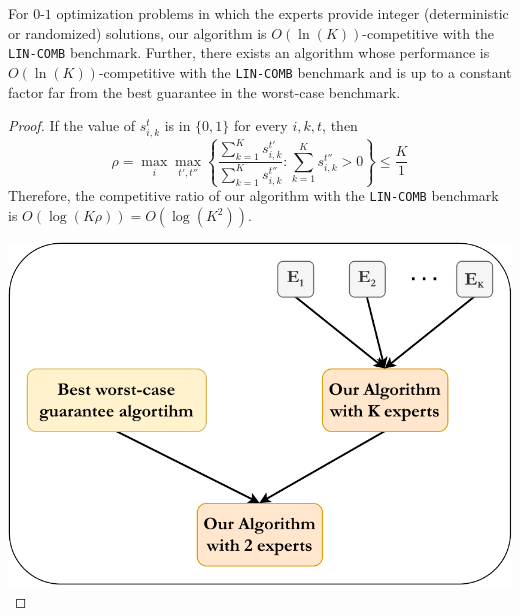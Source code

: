 \begin{corollary} \label{corollary}
	For $0$-$1$ optimization problems in which the experts provide integer (deterministic or randomized) solutions,
	our algorithm is $O(\ln (K))$-competitive with the \texttt{LIN-COMB} benchmark.
	Further, there exists an algorithm whose performance is $O(\ln (K))$-competitive with the \texttt{LIN-COMB}
	benchmark and is up to a constant factor far from the best guarantee in the worst-case benchmark.
\end{corollary}
%
\begin{proof}

	\begin{minipage}[t]{8cm}
		If the value of $s_{i,k}^{t}$ is in $\{0,1\}$ for every $i,k,t$, then
		\[
			\rho = \max_{i} \max_{t',t''} \left\{\frac{\sum_{k=1}^{K} s_{i,k}^{t'}}{\sum_{k=1}^{K} s_{i,k}^{t''}} : \sum_{k=1}^{K} s_{i,k}^{t''} > 0 \right\}
			\leq \frac{K}{1}
		\]
		Therefore, the competitive ratio of our algorithm with the \texttt{LIN-COMB} benchmark is $O(\log (K \rho)) = O(\log (K^2))$.
	\end{minipage}
	\hspace{0.5cm}
	\begin{minipage}[t]{5cm}
			\vspace{-1.0cm}
			\centering
			\hspace{0.45cm}
			\includegraphics[width=\textwidth]{./Img/algo_structure.pdf}
			\vspace{-0.35cm}
			\label{fig:algo-layers}
	\end{minipage}


\end{proof}
